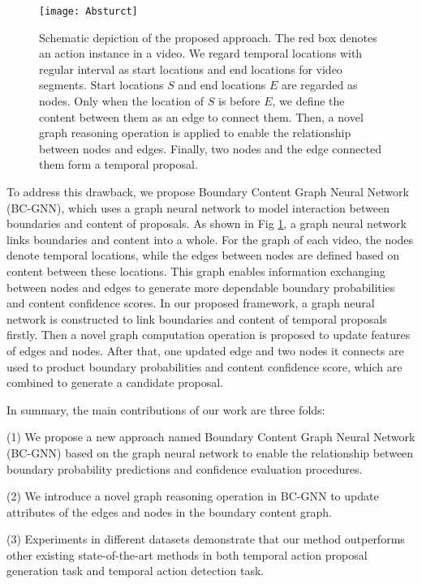 \documentclass[runningheads]{llncs}
\begin{document}
\begin{figure}
\centering
\texttt{[image: Absturct]}
\setlength{\belowcaptionskip}{-.0cm}
\caption{ Schematic depiction of the proposed approach. The red box denotes an action instance in a video. We regard temporal locations with regular interval as start locations and end locations for video segments. Start locations $S$ and end locations $E$ are regarded as nodes. Only when the location of $S$ is before $E$, we define the content between them as an edge to connect them. Then, a novel graph reasoning operation is applied to enable the relationship between nodes and edges. Finally, two nodes and the edge connected them form a temporal proposal.}
\label{introduct}
\end{figure}
To address this drawback, we propose Boundary Content Graph Neural Network (BC-GNN), which uses a graph neural network to model interaction between boundaries and content of proposals. As shown in Fig \ref{introduct}, a graph neural network links boundaries and content into a whole. For the graph of each video, the nodes denote temporal locations, while the edges between nodes are defined based on content between these locations. This graph enables information exchanging between nodes and edges to generate more dependable boundary probabilities and content confidence scores. In our proposed framework, a graph neural network is constructed to link boundaries and content of temporal proposals firstly.  Then a novel graph computation operation is proposed to update features of edges and nodes. After that, one updated edge and two nodes it connects are used to product boundary probabilities and content confidence score, which are combined to generate a candidate proposal.

In summary, the main contributions of our work are three folds:

(1) We propose a new approach named Boundary Content Graph Neural Network (BC-GNN) based on the graph neural network to enable the relationship between boundary probability predictions and confidence evaluation procedures.

(2) We introduce a novel graph reasoning operation in BC-GNN to update attributes of the edges and nodes in the boundary content graph.

(3) Experiments in different datasets demonstrate that our method outperforms other existing state-of-the-art methods in both temporal action proposal generation task and temporal action detection task.
\end{document}
